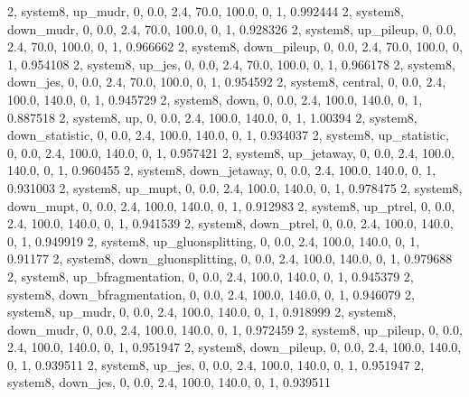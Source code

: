 2, system8, up_mudr,         0, 0.0, 2.4, 70.0, 100.0, 0, 1, 0.992444
2, system8, down_mudr,       0, 0.0, 2.4, 70.0, 100.0, 0, 1, 0.928326
2, system8, up_pileup,       0, 0.0, 2.4, 70.0, 100.0, 0, 1, 0.966662
2, system8, down_pileup,     0, 0.0, 2.4, 70.0, 100.0, 0, 1, 0.954108
2, system8, up_jes,          0, 0.0, 2.4, 70.0, 100.0, 0, 1, 0.966178
2, system8, down_jes,        0, 0.0, 2.4, 70.0, 100.0, 0, 1, 0.954592
2, system8, central,    0, 0.0, 2.4, 100.0, 140.0, 0, 1, 0.945729
2, system8, down,       0, 0.0, 2.4, 100.0, 140.0, 0, 1, 0.887518
2, system8, up,         0, 0.0, 2.4, 100.0, 140.0, 0, 1, 1.00394
2, system8, down_statistic,       0, 0.0, 2.4, 100.0, 140.0, 0, 1, 0.934037
2, system8, up_statistic,         0, 0.0, 2.4, 100.0, 140.0, 0, 1, 0.957421
2, system8, up_jetaway,      0, 0.0, 2.4, 100.0, 140.0, 0, 1, 0.960455
2, system8, down_jetaway,    0, 0.0, 2.4, 100.0, 140.0, 0, 1, 0.931003
2, system8, up_mupt,         0, 0.0, 2.4, 100.0, 140.0, 0, 1, 0.978475
2, system8, down_mupt,       0, 0.0, 2.4, 100.0, 140.0, 0, 1, 0.912983
2, system8, up_ptrel,        0, 0.0, 2.4, 100.0, 140.0, 0, 1, 0.941539
2, system8, down_ptrel,      0, 0.0, 2.4, 100.0, 140.0, 0, 1, 0.949919
2, system8, up_gluonsplitting, 0, 0.0, 2.4, 100.0, 140.0, 0, 1, 0.91177
2, system8, down_gluonsplitting, 0, 0.0, 2.4, 100.0, 140.0, 0, 1, 0.979688
2, system8, up_bfragmentation, 0, 0.0, 2.4, 100.0, 140.0, 0, 1, 0.945379
2, system8, down_bfragmentation, 0, 0.0, 2.4, 100.0, 140.0, 0, 1, 0.946079
2, system8, up_mudr,         0, 0.0, 2.4, 100.0, 140.0, 0, 1, 0.918999
2, system8, down_mudr,       0, 0.0, 2.4, 100.0, 140.0, 0, 1, 0.972459
2, system8, up_pileup,       0, 0.0, 2.4, 100.0, 140.0, 0, 1, 0.951947
2, system8, down_pileup,     0, 0.0, 2.4, 100.0, 140.0, 0, 1, 0.939511
2, system8, up_jes,          0, 0.0, 2.4, 100.0, 140.0, 0, 1, 0.951947
2, system8, down_jes,        0, 0.0, 2.4, 100.0, 140.0, 0, 1, 0.939511
